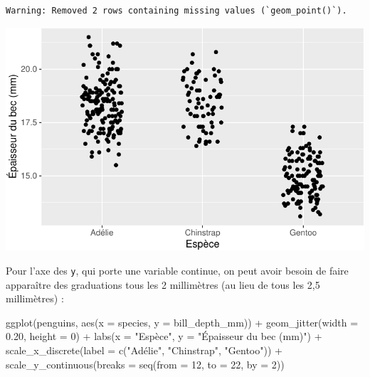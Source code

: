 \documentclass[
  a4paper,
  DIV=11,
  numbers=noendperiod,
  oneside]{scrreprt}
\newenvironment{Shaded}{}{}
\newcommand{\AttributeTok}[1]{\textcolor[rgb]{0.84,0.23,0.29}{#1}}
\newcommand{\DecValTok}[1]{\textcolor[rgb]{0.00,0.36,0.77}{#1}}
\newcommand{\FloatTok}[1]{\textcolor[rgb]{0.00,0.36,0.77}{#1}}
\newcommand{\FunctionTok}[1]{\textcolor[rgb]{0.44,0.26,0.76}{#1}}
\newcommand{\NormalTok}[1]{\textcolor[rgb]{0.14,0.16,0.18}{#1}}
\newcommand{\SpecialCharTok}[1]{\textcolor[rgb]{0.00,0.36,0.77}{#1}}
\newcommand{\StringTok}[1]{\textcolor[rgb]{0.01,0.18,0.38}{#1}}
\begin{document}
\begin{verbatim}
Warning: Removed 2 rows containing missing values (`geom_point()`).
\end{verbatim}

\includegraphics{03-visualization_files/figure-pdf/unnamed-chunk-105-1.pdf}

Pour l'axe des \texttt{y}, qui porte une variable continue, on peut
avoir besoin de faire apparaître des graduations tous les 2 millimètres
(au lieu de tous les 2,5 millimètres) :

\begin{Shaded}
\begin{Highlighting}[]
\FunctionTok{ggplot}\NormalTok{(penguins, }\FunctionTok{aes}\NormalTok{(}\AttributeTok{x =}\NormalTok{ species, }\AttributeTok{y =}\NormalTok{ bill\_depth\_mm)) }\SpecialCharTok{+}
  \FunctionTok{geom\_jitter}\NormalTok{(}\AttributeTok{width =} \FloatTok{0.20}\NormalTok{, }\AttributeTok{height =} \DecValTok{0}\NormalTok{) }\SpecialCharTok{+}
  \FunctionTok{labs}\NormalTok{(}\AttributeTok{x =} \StringTok{"Espèce"}\NormalTok{, }\AttributeTok{y =} \StringTok{"Épaisseur du bec (mm)"}\NormalTok{) }\SpecialCharTok{+}
  \FunctionTok{scale\_x\_discrete}\NormalTok{(}\AttributeTok{label =} \FunctionTok{c}\NormalTok{(}\StringTok{"Adélie"}\NormalTok{, }\StringTok{"Chinstrap"}\NormalTok{, }\StringTok{"Gentoo"}\NormalTok{)) }\SpecialCharTok{+}
  \FunctionTok{scale\_y\_continuous}\NormalTok{(}\AttributeTok{breaks =} \FunctionTok{seq}\NormalTok{(}\AttributeTok{from =} \DecValTok{12}\NormalTok{, }\AttributeTok{to =} \DecValTok{22}\NormalTok{, }\AttributeTok{by =} \DecValTok{2}\NormalTok{))}
\end{Highlighting}
\end{Shaded}
\end{document}
